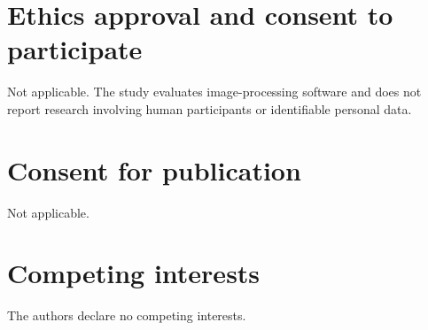 \documentclass[12pt]{article}
\begin{document}
\section*{Ethics approval and consent to participate}

Not applicable. The study evaluates image-processing software and does not report research involving human participants or identifiable personal data.

\section*{Consent for publication}

Not applicable.

\section*{Competing interests}

The authors declare no competing interests.



\end{document}
